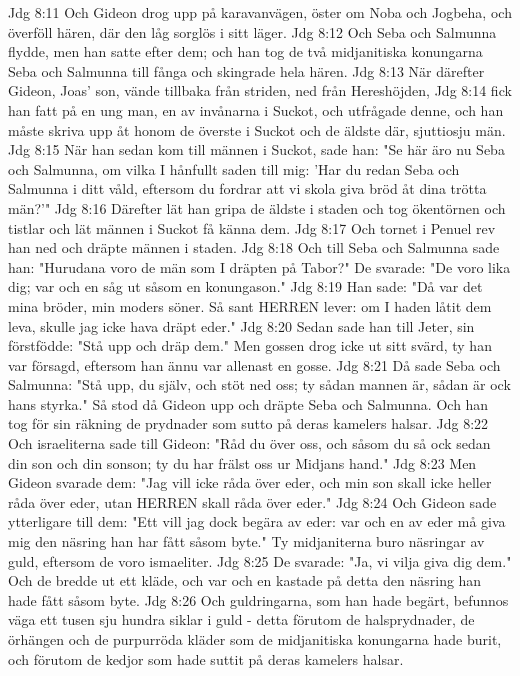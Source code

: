 Jdg 8:11  Och Gideon drog upp på karavanvägen, öster om Noba och Jogbeha, och överföll hären, där den låg sorglös i sitt läger.
Jdg 8:12  Och Seba och Salmunna flydde, men han satte efter dem; och han tog de två midjanitiska konungarna Seba och Salmunna till fånga och skingrade hela hären.
Jdg 8:13  När därefter Gideon, Joas' son, vände tillbaka från striden, ned från Hereshöjden,
Jdg 8:14  fick han fatt på en ung man, en av invånarna i Suckot, och utfrågade denne, och han måste skriva upp åt honom de överste i Suckot och de äldste där, sjuttiosju män.
Jdg 8:15  När han sedan kom till männen i Suckot, sade han: "Se här äro nu Seba och Salmunna, om vilka I hånfullt saden till mig: 'Har du redan Seba och Salmunna i ditt våld, eftersom du fordrar att vi skola giva bröd åt dina trötta män?'"
Jdg 8:16  Därefter lät han gripa de äldste i staden och tog ökentörnen och tistlar och lät männen i Suckot få känna dem.
Jdg 8:17  Och tornet i Penuel rev han ned och dräpte männen i staden.
Jdg 8:18  Och till Seba och Salmunna sade han: "Hurudana voro de män som I dräpten på Tabor?" De svarade: "De voro lika dig; var och en såg ut såsom en konungason."
Jdg 8:19  Han sade: "Då var det mina bröder, min moders söner. Så sant HERREN lever: om I haden låtit dem leva, skulle jag icke hava dräpt eder."
Jdg 8:20  Sedan sade han till Jeter, sin förstfödde: "Stå upp och dräp dem." Men gossen drog icke ut sitt svärd, ty han var försagd, eftersom han ännu var allenast en gosse.
Jdg 8:21  Då sade Seba och Salmunna: "Stå upp, du själv, och stöt ned oss; ty sådan mannen är, sådan är ock hans styrka." Så stod då Gideon upp och dräpte Seba och Salmunna. Och han tog för sin räkning de prydnader som sutto på deras kamelers halsar.
Jdg 8:22  Och israeliterna sade till Gideon: "Råd du över oss, och såsom du så ock sedan din son och din sonson; ty du har frälst oss ur Midjans hand."
Jdg 8:23  Men Gideon svarade dem: "Jag vill icke råda över eder, och min son skall icke heller råda över eder, utan HERREN skall råda över eder."
Jdg 8:24  Och Gideon sade ytterligare till dem: "Ett vill jag dock begära av eder: var och en av eder må giva mig den näsring han har fått såsom byte." Ty midjaniterna buro näsringar av guld, eftersom de voro ismaeliter.
Jdg 8:25  De svarade: "Ja, vi vilja giva dig dem." Och de bredde ut ett kläde, och var och en kastade på detta den näsring han hade fått såsom byte.
Jdg 8:26  Och guldringarna, som han hade begärt, befunnos väga ett tusen sju hundra siklar i guld - detta förutom de halsprydnader, de örhängen och de purpurröda kläder som de midjanitiska konungarna hade burit, och förutom de kedjor som hade suttit på deras kamelers halsar.
